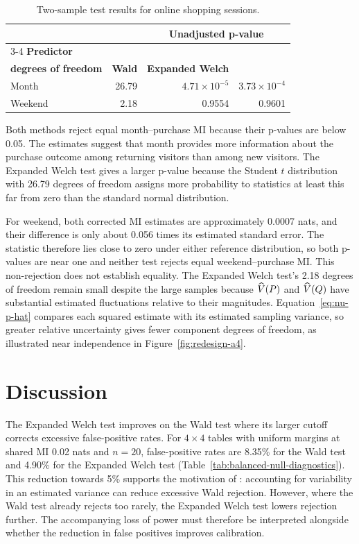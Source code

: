 \begin{table}[H]
\centering
\caption{Two-sample test results for online shopping sessions.}
\label{tab:shoppers-test-results}
\thesistableformat
\begin{tabular*}{0.92\textwidth}{@{\extracolsep{\fill}}lrrr@{}}
\toprule
 & & \multicolumn{2}{c}{\textbf{Unadjusted p-value}}\\
\cmidrule(lr){3-4}
\textbf{Predictor} & \shortstack[r]{\textbf{Expanded Welch}\\\textbf{degrees of freedom}}
 & \textbf{Wald} & \textbf{Expanded Welch}\\
\midrule
Month & 26.79 & \(4.71\times10^{-5}\) & \(3.73\times10^{-4}\)\\
\addlinespace[0.35em]
Weekend & 2.18 & 0.9554 & 0.9601\\
\bottomrule
\end{tabular*}
\end{table}
\endgroup

Both methods reject equal month--purchase MI because their p-values
are below 0.05. The estimates suggest that month provides more information
about the purchase outcome among returning visitors than among new visitors.
The Expanded Welch test gives a larger p-value because the Student
\(t\) distribution with 26.79 degrees of freedom assigns more probability
to statistics at least this far from zero than the standard normal
distribution.

For weekend, both corrected MI estimates are approximately 0.0007 nats,
and their difference is only about 0.056 times its estimated standard
error. The statistic therefore lies close to zero under either reference
distribution, so both p-values are near one and neither test rejects
equal weekend--purchase MI. This non-rejection does not establish equality. The Expanded Welch test's 2.18 degrees of freedom remain small despite the large samples because \(\widehat V(P)\) and
\(\widehat V(Q)\) have substantial estimated fluctuations relative to
their magnitudes. Equation~\eqref{eq:nu-p-hat} compares each squared estimate with its
estimated sampling variance, so greater relative uncertainty gives fewer
component degrees of freedom, as illustrated near independence in
Figure~\ref{fig:redesign-a4}.

\section{Discussion}
\label{sec:results-discussion}

The Expanded Welch test improves on the Wald test where its larger cutoff corrects
excessive false-positive rates. For \(4\times4\) tables with uniform margins
at shared MI 0.02 nats and \(n=20\), false-positive rates are 8.35\% for the
Wald test and 4.90\% for the Expanded Welch test
(Table~\ref{tab:balanced-null-diagnostics}). This reduction towards 5\%
supports the motivation of \citet{panwall2002}: accounting for variability
in an estimated variance can reduce excessive Wald rejection. However,
where the Wald test already rejects too rarely, the Expanded Welch test lowers rejection
further. The accompanying loss of power must therefore
be interpreted alongside whether the reduction in false positives improves
calibration.

